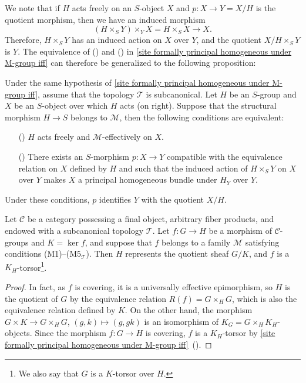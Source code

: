 We note that if $H$ acts freely on an $S$-object $X$ and $p:X\to Y=X/H$ is the quotient morphism, then we have an induced morphism
\[(H\times_SY)\times_YX=H\times_SX\to X.\]
Therefore, $H\times_SY$ has an induced action on $X$ over $Y$, and the quotient $X/H\times_SY$ is $Y$. The equivalence of () and () in \cref{site formally principal homogeneous under M-group iff} can therefore be generalized to the following proposition:
\begin{proposition}\label{site M-effective principal homogeneous bundle iff}
Under the same hypothesis of \cref{site formally principal homogeneous under M-group iff}, assume that the topology $\mathcal{T}$ is subcanonical. Let $H$ be an $S$-group and $X$ be an $S$-object over which $H$ acts (on right). Suppose that the structural morphism $H\to S$ belongs to $\mathcal{M}$, then the following conditions are equivalent:
\begin{enumerate}
    \item[(\rmnum{1})] $H$ acts freely and $\mathcal{M}$-effectively on $X$. 
    \item[(\rmnum{2})] There exists an $S$-morphism $p:X\to Y$ compatible with the equivalence relation on $X$ defined by $H$ and such that the induced action of $H\times_SY$ on $X$ over $Y$ makes $X$ a principal homogeneous bundle under $H_Y$ over $Y$.
\end{enumerate}
Under these conditions, $p$ identifies $Y$ with the quotient $X/H$.
\end{proposition}

\begin{corollary}\label{site covering morphism of quotient by ker is torsor}
Let $\mathcal{C}$ be a category possessing a final object, arbitrary fiber products, and endowed with a subcanonical topology $\mathcal{T}$. Let $f:G\to H$ be a morphism of $\mathcal{C}$-groups and $K=\ker f$, and suppose that $f$ belongs to a family $\mathcal{M}$ satisfying conditions (M1)--($\text{M}5_\mathcal{T}$). Then $H$ represents the quotient sheaf $G/K$, and $f$ is a $K_H$-torsor\footnote{We also say that $G$ is a $K$-torsor over $H$.}.
\end{corollary}
\begin{proof}
In fact, as $f$ is covering, it is a universally effective epimorphism, so $H$ is the quotient of $G$ by the equivalence relation $R(f)=G\times_HG$, which is also the equivalence relation defined by $K$. On the other hand, the morphism $G\times K\to G\times_HG$, $(g,k)\mapsto(g,gk)$ is an isomorphism of $K_G=G\times_HK_H$-objects. Since the morphism $f:G\to H$ is covering, $f$ is a $K_H$-torsor by \cref{site formally principal homogeneous under M-group iff}~().
\end{proof}


